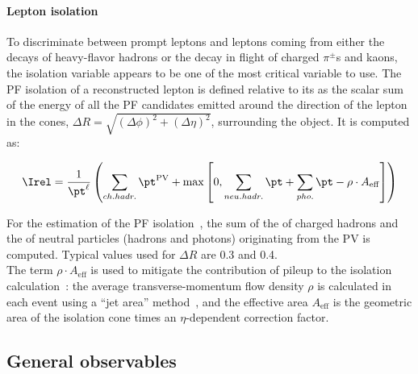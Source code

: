\paragraph{Lepton isolation}\label{sec:c2iso}
To discriminate between prompt leptons and leptons coming from either the decays
of heavy-flavor hadrons or the decay in flight of charged $\pi^{\pm}$s and kaons, the isolation variable appears to be one of
the most critical variable to use. The PF isolation of a reconstructed
lepton is defined relative to its \pt as the scalar
sum of the energy of all the PF candidates emitted around the
direction of the lepton in the cones, $\Delta R = \sqrt{(\Delta
  \phi)^2+(\Delta \eta)^2}$, surrounding the object. It is computed as:
\begin{linenomath}
  \begin{equation}
    \label{eq:c2irel}
    \Irel = \frac{1}{\pt^\ell}
    \left(\sum_{ch.hadr.}\pt^{\mathrm{PV}} +
    \max{\left[0, \sum_{neu.hadr.}\pt + \sum_{pho.}\pt
        - \rho\cdot A_{\mathrm{eff}}\right]}\right)
  \end{equation}
\end{linenomath}
For the estimation of the PF isolation~\cite{CMS:particleflow}, the sum of the
\pt of charged hadrons and the \pt of neutral particles (hadrons
and photons) originating from the PV is computed. Typical values used for  $\Delta
R$ are 0.3 and 0.4.\\
The term $\rho\cdot A_{\mathrm{eff}}$ is used to mitigate the
contribution of pileup to the isolation calculation~\cite{Sirunyan_2018_muon}: the average
transverse-momentum flow density $\rho$ is calculated in each event
using a ``jet area'' method~\cite{CACCIARI2008119}, and the effective
area $A_{\mathrm{eff}}$ is the geometric area of the isolation cone
times an $\eta$-dependent correction factor.


\subsection*{General observables} \label{sec:c2observables}

